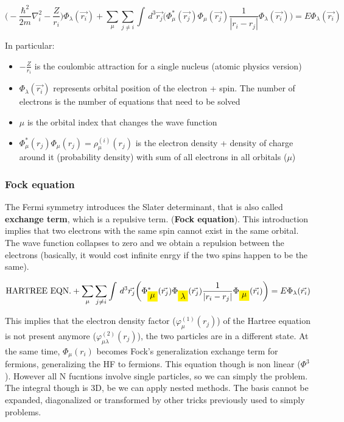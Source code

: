 		$$\bigg(-\frac{\hbar^2}{2m}\nabla^2_i-\frac{Z}{r_i}\bigg)\Phi_\lambda(\vec{r_i})+\sum_\mu \sum_{j \neq i} \int\,d^3\vec{r_j}\bigg(\Phi^*_\mu(\vec{r_j})\Phi_\mu(\vec{r_j})\frac{1}{|r_i-r_j|}\Phi_\lambda(\vec{r_i})\bigg)=E\Phi_\lambda(\vec{r_i})$$

		In particular:

		\begin{multicols}{2}
			\begin{itemize}
				\item $-\frac{Z}{r_i}$ is the coulombic attraction for a single nucleus (atomic physics version)
				\item $\Phi_\lambda(\vec{r_i})$ represents orbital position of the electron + spin. The number of electrons is the number of equations that need to be solved
				\item $\mu$ is the orbital index that changes the wave function
				\item $\Phi^*_\mu(r_j)\Phi_\mu(r_j) = \rho_\mu^{(i)}(r_j)$ is the electron density + density of charge around it (probability density) with sum of all electrons in all orbitals ($\mu$)
			\end{itemize}
		\end{multicols}

		\subsubsection{Fock equation}
		The Fermi symmetry introduces the Slater determinant, that is also called \textbf{exchange term}, which is a repulsive term. (\textbf{Fock equation}).
		This introduction implies that two electrons with the same spin cannot exist in the same orbital.
		The wave function collapses to zero and we obtain a repulsion between the electrons (basically, it would cost infinite enrgy if the two spins happen to be the same).

		$$\text{HARTREE EQN.}+\sum_\mu \sum_{j \neq i} \int\,d^3\vec{r_j}\bigg(\Phi^*_{\mathcolorbox{yellow}{\mu}}(\vec{r_j})\Phi_{\mathcolorbox{yellow}{\lambda}}(\vec{r_j})\frac{1}{|r_i-r_j|}\Phi_{\mathcolorbox{yellow}{\mu}}(\vec{r_i})\bigg)=E\Phi_\lambda(\vec{r_i})$$

		This implies that the electron density factor ($\varphi^{(1)}_\mu(r_j)$) of the Hartree equation is not present anymore ($\varphi^{(2)}_{\mu\lambda}(r_j)$), the two particles are in a different state.
		At the same time, $\Phi_\mu(r_i)$ becomes Fock's generalization exchange term for fermions, generalizing the HF to fermions.
		This equation though is non linear ($\Phi^3$).
		However all N fucntions involve single particles, so we can simply the problem.
		The integral though is 3D, be we can apply nested methods.
		The basis cannot be expanded, diagonalized or transformed by other tricks previously used to simply problems.

